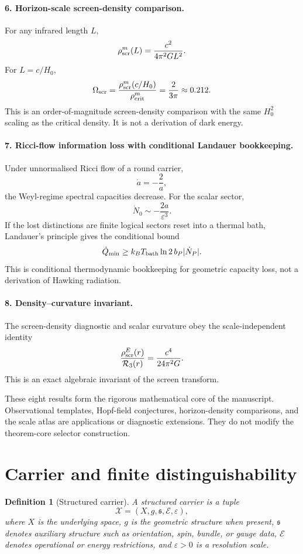 \documentclass[11pt,a4paper]{article}
\newtheorem{definition}[theorem]{Definition}
\begin{document}
\paragraph{6. Horizon-scale screen-density comparison.}
For any infrared length \(L\),
\[
\rho_{\rm scr}^{m}(L)
=
\frac{c^2}{4\pi^2G L^2}.
\]
For \(L=c/H_0\),
\[
\Omega_{\rm scr}
=
\frac{\rho_{\rm scr}^{m}(c/H_0)}
{\rho_{\rm crit}^{m}}
=
\frac{2}{3\pi}
\approx0.212.
\]
This is an order-of-magnitude screen-density comparison with the same \(H_0^2\) scaling as the critical density.  It is not a derivation of dark energy.

\paragraph{7. Ricci-flow information loss with conditional Landauer bookkeeping.}
Under unnormalised Ricci flow of a round carrier,
\[
\dot a=-\frac2a,
\]
the Weyl-regime spectral capacities decrease.  For the scalar sector,
\[
\dot N_0\sim-\frac{2a}{\varepsilon^3}.
\]
If the lost distinctions are finite logical sectors reset into a thermal bath, Landauer's principle gives the conditional bound
\[
\dot Q_{\min}
\ge
k_BT_{\rm bath}\ln2\,b_P|\dot N_P|.
\]
This is conditional thermodynamic bookkeeping for geometric capacity loss, not a derivation of Hawking radiation.

\paragraph{8. Density--curvature invariant.}
The screen-density diagnostic and scalar curvature obey the scale-independent identity
\[
\frac{\rho_{\rm scr}^{E}(r)}{\mathcal R_3(r)}
=
\frac{c^4}{24\pi^2G}.
\]
This is an exact algebraic invariant of the screen transform.

These eight results form the rigorous mathematical core of the manuscript.  Observational templates, Hopf-field conjectures, horizon-density comparisons, and the scale atlas are applications or diagnostic extensions.  They do not modify the theorem-core selector construction.

\section{Carrier and finite distinguishability}

\begin{definition}[Structured carrier]
A structured carrier is a tuple
\[
\mathcal X=(X,g,\mathfrak s,\mathcal E,\varepsilon),
\]
where $X$ is the underlying space, $g$ is the geometric structure when present, $\mathfrak s$ denotes auxiliary structure such as orientation, spin, bundle, or gauge data, $\mathcal E$ denotes operational or energy restrictions, and $\varepsilon>0$ is a resolution scale.
\end{definition}
\end{document}
